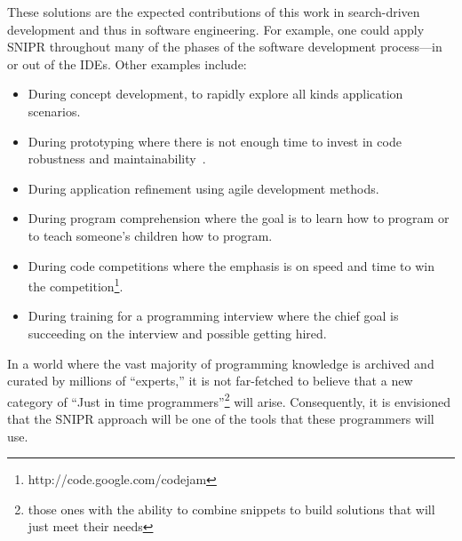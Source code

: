 These solutions are the expected contributions of this work in search-driven development and thus in software engineering. For example, one could apply \uppercase{SnipR} throughout many of the phases of the software development process---in or out of the IDEs. Other examples include:

\begin{itemize}
\item During concept development, to rapidly explore all kinds application scenarios.
\item During prototyping where there is not enough time to invest in 
    code robustness and maintainability~\cite{Brandt:2008wi, Ncube:2008fm, Brandt:2009jb}. 
\item During application refinement using agile development methods. 
\item During program comprehension where the goal is to learn how to program or 
    to teach someone's children how to program.  
\item During code competitions where the emphasis is on speed and time to win 
    the competition\footnote{http://code.google.com/codejam}.
\item During training for a programming interview where the chief goal is succeeding on the 
    interview and possible getting hired.
\end{itemize}

In a world where the vast majority of programming knowledge is archived and curated by millions of ``experts,'' it is not far-fetched to believe that a new category of ``Just in time programmers''\footnote{those ones with the ability to combine snippets to build solutions that will just meet their needs} will arise. Consequently, it is envisioned that the \uppercase{SnipR} approach will be one of the tools that these programmers will use. 



